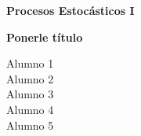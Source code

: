 \documentclass[12pt,a4paper,openany]{memoir}
\begin{document}

\begin{titlingpage} %

    \raggedleft %
	
	\vspace*{\baselineskip} %
	
	\vspace*{0.25\textheight} %
	
	
    \textbf{\huge Procesos Estocásticos I}\\[\baselineskip] %
    
    \vspace*{0.1\textheight}

    {\Huge{\textbf{Ponerle título}}}\\[\baselineskip] %
    \vspace*{0.1\textheight}

    
    {\Large Alumno 1}\\[\baselineskip]
    {\Large Alumno 2}\\[\baselineskip]
    {\Large Alumno 3}\\[\baselineskip]
    {\Large Alumno 4}\\[\baselineskip]
    {\Large Alumno 5}\\[\baselineskip]
	
	\vfill

\end{titlingpage}

\tableofcontents
\listoffigures
\listoftables

\mainmatter
\thispagestyle{empty}





\newpage
\appendix



\newpage
\backmatter
\printbibliography[title={Referencias}]
\end{document}
